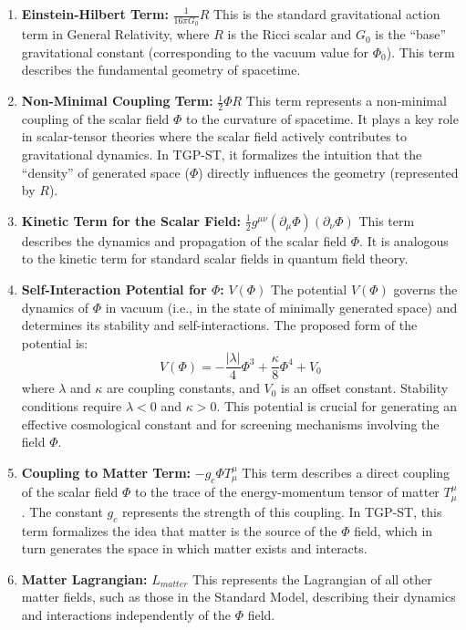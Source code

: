 \documentclass[11pt,a4paper]{article}
\begin{document}
\begin{enumerate}
    \item \textbf{Einstein-Hilbert Term:} $\frac{1}{16\pi G_0}R$  
    This is the standard gravitational action term in General Relativity, where $R$ is the Ricci scalar and $G_0$ is the “base” gravitational constant (corresponding to the vacuum value for $\Phi_0$). This term describes the fundamental geometry of spacetime.

    \item \textbf{Non-Minimal Coupling Term:} $\frac{1}{2}\Phi R$  
    This term represents a non-minimal coupling of the scalar field $\Phi$ to the curvature of spacetime. It plays a key role in scalar-tensor theories where the scalar field actively contributes to gravitational dynamics. In TGP-ST, it formalizes the intuition that the “density” of generated space ($\Phi$) directly influences the geometry (represented by $R$).

    \item \textbf{Kinetic Term for the Scalar Field:} $\frac{1}{2}g^{\mu\nu}(\partial_\mu\Phi)(\partial_\nu\Phi)$  
    This term describes the dynamics and propagation of the scalar field $\Phi$. It is analogous to the kinetic term for standard scalar fields in quantum field theory.

    \item \textbf{Self-Interaction Potential for $\Phi$:} $V(\Phi)$  
    The potential $V(\Phi)$ governs the dynamics of $\Phi$ in vacuum (i.e., in the state of minimally generated space) and determines its stability and self-interactions. The proposed form of the potential is:
    \begin{equation}
        V(\Phi) = -\frac{|\lambda|}{4}\Phi^3 + \frac{\kappa}{8}\Phi^4 + V_0
        \label{eq:ScalarPotential}
    \end{equation}
    where $\lambda$ and $\kappa$ are coupling constants, and $V_0$ is an offset constant. Stability conditions require $\lambda < 0$ and $\kappa > 0$. This potential is crucial for generating an effective cosmological constant and for screening mechanisms involving the field $\Phi$.

    \item \textbf{Coupling to Matter Term:} $-g_{c}\Phi T^\mu_\mu$  
    This term describes a direct coupling of the scalar field $\Phi$ to the trace of the energy-momentum tensor of matter $T^\mu_\mu$. The constant $g_{c}$ represents the strength of this coupling. In TGP-ST, this term formalizes the idea that matter is the source of the $\Phi$ field, which in turn generates the space in which matter exists and interacts.

    \item \textbf{Matter Lagrangian:} $L_{matter}$  
    This represents the Lagrangian of all other matter fields, such as those in the Standard Model, describing their dynamics and interactions independently of the $\Phi$ field.
\end{enumerate}
\end{document}
